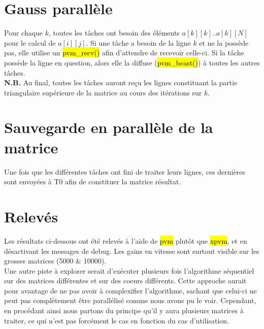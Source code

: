 \documentclass[a4paper,table]{article}
\begin{document}



\newpage

\section{Gauss parallèle}

Pour chaque $k$, toutes les tâches ont besoin des éléments $a[k][k]..a[k][N]$ pour
le calcul de $a[i][j]$. Si une tâche a besoin de la ligne $k$ et ne la possède pas,
elle utilise un \hl{pvm\_recv()} afin d'attendre de recevoir celle-ci. Si la tâche
possède la ligne en question, alors elle la diffuse (\hl{pvm\_bcast()}) à toutes
les autres tâches.\\

\textbf{N.B.} Au final, toutes les tâches auront reçu les lignes constituant la
partie triangulaire supérieure de la matrice au cours des itérations sur $k$.\\


\newpage

\section{Sauvegarde en parallèle de la matrice}

Une fois que les différentes tâches ont fini de traiter leurs lignes, ces
dernières sont envoyées à T0 afin de constituer la matrice résultat.\\




\newpage

\section{Relevés}

Les résultats ci-dessous ont été relevés à l'aide de \hl{pvm} plutôt que
\hl{xpvm}, et en désactivant les messages de debug. Les gains en vitesse sont
surtout visible sur les grosses matrices (5000 \& 10000).\\

Une autre piste à explorer serait d'exécuter plusieurs fois l'algorithme
séquentiel sur des matrices différentes et sur des coeurs différents. Cette
approche aurait pour avantage de ne pas avoir à complexifier l'algorithme,
sachant que celui-ci ne peut pas complètement être parallélisé
comme nous avons pu le voir. Cependant, en procédant ainsi nous partons du
principe qu'il y aura plusieurs matrices à traiter, ce qui n'est pas forcément
le cas en fonction du cas d'utilisation.\\
\end{document}
